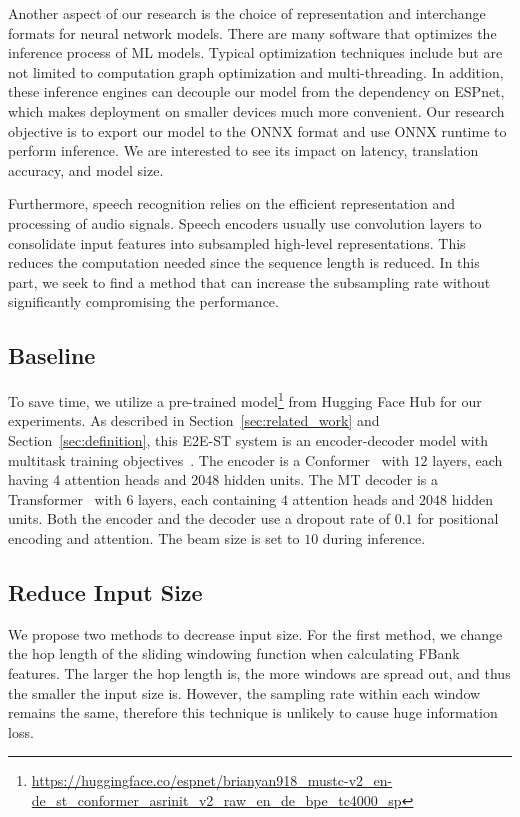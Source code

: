 \documentclass[11pt]{article}
\begin{document}
Another aspect of our research is the choice of representation and interchange formats for neural network models.
There are many software that optimizes the inference process of ML models.
Typical optimization techniques include but are not limited to computation graph optimization and multi-threading.
In addition, these inference engines can decouple our model from the dependency on ESPnet, which makes deployment on smaller devices much more convenient.
Our research objective is to export our model to the ONNX format and use ONNX runtime to perform inference. We are interested to see its impact on latency, translation accuracy, and model size.

Furthermore, speech recognition relies on the efficient representation and processing of audio signals. Speech encoders usually use convolution layers to consolidate input features into subsampled high-level representations. This reduces the computation needed since the sequence length is reduced. In this part, we seek to find a method that can increase the subsampling rate without significantly compromising the performance.

\subsection{Baseline}

To save time, we utilize a pre-trained model\footnote{\url{https://huggingface.co/espnet/brianyan918_mustc-v2_en-de_st_conformer_asrinit_v2_raw_en_de_bpe_tc4000_sp}} from Hugging Face Hub for our experiments.
As described in Section~\ref{sec:related_work} and Section~\ref{sec:definition},
this E2E-ST system is an encoder-decoder model with multitask training objectives~\cite{inaguma2020espnet}.
The encoder is a Conformer~\cite{conformer} with $12$ layers, each having $4$ attention heads and $2048$ hidden units.
The MT decoder is a Transformer~\cite{transformer} with $6$ layers, each containing $4$ attention heads and $2048$ hidden units.
Both the encoder and the decoder use a dropout rate of $0.1$ for positional encoding and attention.
The beam size is set to $10$ during inference.

\subsection{Reduce Input Size}
We propose two methods to decrease input size.
For the first method, we change the hop length of the sliding windowing function when calculating FBank features. The larger the hop length is, the more windows are spread out, and thus the smaller the input size is. However, the sampling rate within each window remains the same, therefore this technique is unlikely to cause huge information loss.
\end{document}
